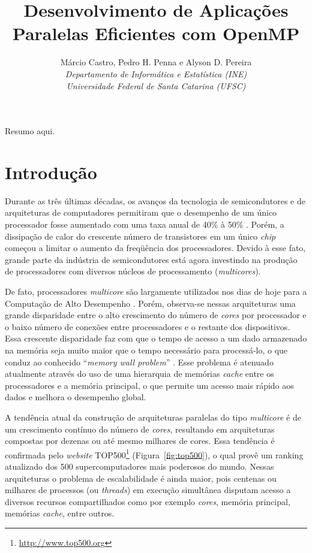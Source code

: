 \documentclass{SBCbookchapter}
\author{Márcio Castro, Pedro H. Penna e Alyson D. Pereira\\
\textit{Departamento de Informática e Estatística (INE)}\\
\textit{Universidade Federal de Santa Catarina (UFSC)}
}
\title{Desenvolvimento de Aplicações Paralelas Eficientes com OpenMP}
\begin{document}
\maketitle

\begin{resumo}
Resumo aqui.
\end{resumo}

\section{Introdução}

	Durante as três últimas décadas, os avanços da tecnologia de
	semicondutores e de arquiteturas de computadores permitiram que o
	desempenho de um único processador fosse aumentado com uma taxa anual de
	40\% à 50\% \cite{LARUS08}. Porém, a dissipação de calor do crescente
	número de transistores em um único \emph{chip} começou a limitar o
	aumento da freqüência dos processadores. Devido à esse fato, grande
	parte da indústria de semicondutores está agora investindo na produção
	de processadores com diversos núcleos de processamento
	(\emph{multicores}).

	De fato, processadores \emph{multicore} são largamente utilizados nos
	dias de hoje para a Computação de Alto Desempenho \cite{Asanovic09}.
	Porém, observa-se nessas arquiteturas uma grande disparidade entre o
	alto crescimento do número de \emph{cores} por processador e o baixo
	número de conexões entre processadores e o restante dos dispositivos.
	Essa crescente disparidade faz com que o tempo de acesso a um dado
	armazenado na memória seja muito maior que o tempo necessário para
	processá-lo, o que conduz ao conhecido ``\emph{memory wall problem}''
	\cite{McKee-MemWall:2004}. Esse problema é atenuado atualmente através
	do uso de uma hierarquia de memórias \emph{cache} entre os processadores
	e a memória principal, o que permite um acesso mais rápido aos dados e
	melhora o desempenho global.

	A tendência atual da construção de arquiteturas paralelas do tipo
	\emph{multicore} é de um crescimento contínuo do número de \emph{cores},
	resultando em arquiteturas compostas por dezenas ou até mesmo milhares
	de cores. Essa tendência é confirmada pelo \emph{website}
	TOP500\footnote{\url{http://www.top500.org}} (Figura~\ref{fig:top500}),
	o qual provê um ranking atualizado dos 500 supercomputadores mais
	poderosos do mundo. Nessas arquiteturas o problema de escalabilidade é
	ainda maior, pois centenas ou milhares de processos (ou \emph{threads})
	em execução simultânea disputam acesso a diversos recursos
	compartilhados como por exemplo \emph{cores}, memória principal,
	memórias \emph{cache}, entre outros.
\end{document}
